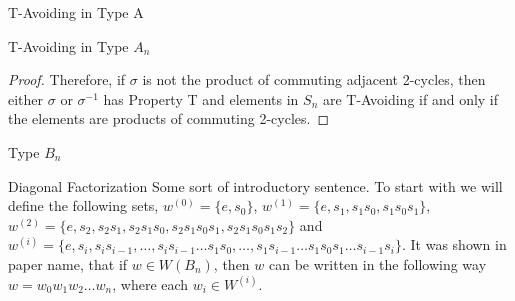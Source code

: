 \documentclass[11pt]{amsart}
\theoremstyle{definition}
\numberwithin{equation}{section}
\renewcommand{\(}{\left(}
\renewcommand{\)}{\right)}
\begin{document}
\begin{section}{T-Avoiding in Type A}
\begin{subsection}{T-Avoiding in Type \textbf{$A_n$}}
\begin{proof}
Therefore, if $\sigma$ is not the product of commuting adjacent 2-cycles, then either $\sigma$ or $\sigma^{-1}$ has Property T and elements in $S_n$ are T-Avoiding if and only if the elements are products of commuting 2-cycles.   
\end{proof}

\end{subsection}	
\end{section}


\begin{section}{Type $B_n$}
	\begin{subsection}{Diagonal Factorization}
		Some sort of introductory sentence. To start with we will define the following sets, $w^{(0)}=\{e, s_0\}$, $w^{(1)}=\{e, s_1, s_1s_0, s_1s_0s_1\}$, $w^{(2)}=\{e, s_2, s_2s_1, s_2s_1s_0, s_2s_1s_0s_1, s_2s_1s_0s_1s_2\}$ and $w^{(i)}=\{e, s_i, s_is_{i-1}, \ldots, s_is_{i-1}\ldots s_1s_0, \ldots, s_1s_{i-1}\ldots s_1s_0s_1 \ldots s_{i-1}s_i\}$. It was shown in {\color{red} paper name}, that if $w \in W(B_n)$, then $w$ can be written in the following way $w=w_0w_1w_2\ldots w_n$, where each $w_i \in W^{(i)}$. 
	\end{subsection}
\end{section}
\end{document}
